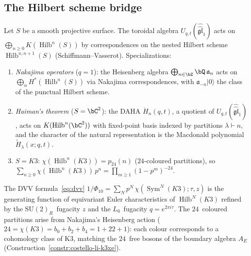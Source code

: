\subsection{The Hilbert scheme bridge}
\label{subsec:bridge-hilbert-schemes}

\begin{theorem}
\label{thm:bridge-sv-toroidal}
Let $S$ be a smooth projective surface. The toroidal algebra
$U_{q,t}(\hat{\hat{\mathfrak{gl}}}_1)$ acts on
$\bigoplus_{n \geq 0} K({\operatorname{Hilb}}^n(S))$
by correspondences on the nested Hilbert scheme
$\operatorname{Hilb}^{n,n+1}(S)$ \textup{(}Schiffmann--Vasserot\textup{)}.
Specializations:
\begin{enumerate}[label=\textup{(\roman*)}]
\item \emph{Nakajima operators} \textup{(}$q = 1$\textup{)}: the
 Heisenberg algebra $\bigoplus_{n \in \bZ} \bQ\,\mathfrak{a}_n$
 acts on $\bigoplus_n H^*(\operatorname{Hilb}^n(S))$ via
 Nakajima correspondences,
 with $\mathfrak{a}_{-n}|0\rangle$
 the class of the punctual Hilbert scheme.
\item \emph{Haiman's theorem} \textup{(}$S = \bC^2$\textup{)}:
 the DAHA $\ddot{H}_n(q,t)$, a quotient of
 $U_{q,t}(\hat{\hat{\mathfrak{gl}}}_1)$, acts on
 $K(\operatorname{Hilb}^n(\bC^2))$ with fixed-point basis
 indexed by partitions $\lambda \vdash n$, and the
 character of the natural representation is the Macdonald
 polynomial $\widetilde{H}_\lambda(x;q,t)$.
\item \emph{$S = K3$}:
 $\chi(\operatorname{Hilb}^n(K3)) = p_{24}(n)$
 \textup{(}$24$-coloured partitions\textup{)}, so
 $\sum_{n \geq 0} \chi(\operatorname{Hilb}^n(K3))\,p^n
 = \prod_{m \geq 1} (1 - p^m)^{-24}$.
\end{enumerate}
\end{theorem}

\begin{proposition}
\label{prop:bridge-dmvv-hilb}
The DVV formula~\eqref{eq:dvv}
$1/\Phi_{10} = \sum_N p^N\,\chi(\operatorname{Sym}^N(K3);\tau,z)$
is the generating function of equivariant Euler characteristics of
$\operatorname{Hilb}^N(K3)$ refined by the $\mathrm{SU}(2)_R$~fugacity
$z$ and the $L_0$~fugacity $q = e^{2\pi i\tau}$. The $24$~coloured
partitions arise from Nakajima's Heisenberg action
\textup{(}$24 = \chi(K3) = b_0 + b_2 + b_4 = 1 + 22 + 1$\textup{)}:
each colour corresponds to a cohomology class of K3, matching the
$24$~free bosons of the boundary algebra $A_E$
\textup{(}Construction~\textup{\ref{constr:costello-li-k3xe})}.
\end{proposition}


